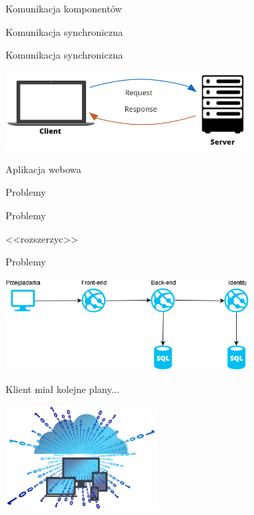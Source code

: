 \documentclass{beamer}
\begin{document}
\begin{frame}{Komunikacja komponentów}
	\begin{center}
		\Huge{Komunikacja synchroniczna}
	\end{center}
\end{frame}

\begin{frame}{Komunikacja synchroniczna}
	\begin{center}
		\includegraphics[height=3cm]{prosta_komunikacja2.png}
	\end{center}
\end{frame}

\begin{frame}{Aplikacja webowa}
	\begin{center}
		\Huge{Problemy}
	\end{center}
\end{frame}

\begin{frame}{Problemy}
	\begin{center}
		\Huge{<<rozszerzyc>>}
	\end{center}
\end{frame}

\begin{frame}{Problemy}
	\begin{center}
		\includegraphics[height=3.5cm]{transaction1.png}
	\end{center}
\end{frame}

\begin{frame}{}
	\begin{center}
		\Huge{Klient miał kolejne plany...}
	\end{center}
\end{frame}

\begin{frame}{}
	\begin{center}
		\includegraphics[height=4cm]{virtual1.png}
	\end{center}
\end{frame}
\end{document}
